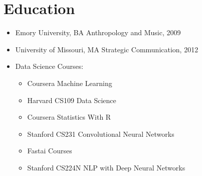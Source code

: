 \documentclass[11pt]{article}
\begin{document}
	\section{Education}
		\begin{itemize}
      \item Emory University, BA Anthropology and Music, 2009
			\item University of Missouri, MA Strategic Communication, 2012
		  \item Data Science Courses:
				\begin{itemize}[noitemsep,nolistsep]
						\item Coursera Machine Learning
						\item Harvard CS109 Data Science
						\item Coursera Statistics With R
						\item Stanford CS231 Convolutional Neural Networks
						\item Fastai Courses
						\item Stanford CS224N NLP with Deep Neural Networks
				\end{itemize}

		\end{itemize}
\end{document}
